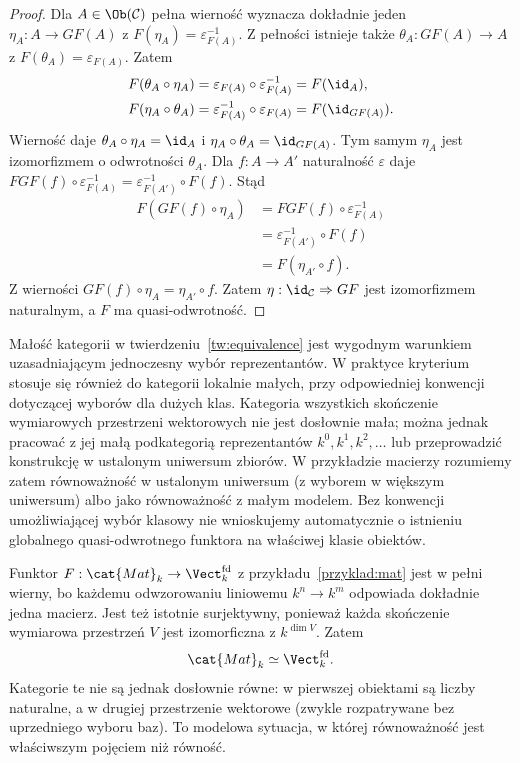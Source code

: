 \begin{proof}
Dla $A\in\Ob(\mathcal C)$ pełna wierność wyznacza dokładnie jeden $\eta_A:A\to GF(A)$ z $F(\eta_A)=\varepsilon_{F(A)}^{-1}$. Z pełności istnieje także $\theta_A:GF(A)\to A$ z $F(\theta_A)=\varepsilon_{F(A)}$. Zatem
\[
\begin{aligned}
F(\theta_A\circ\eta_A)&=\varepsilon_{F(A)}\circ\varepsilon_{F(A)}^{-1}=F(\id_A),\\
F(\eta_A\circ\theta_A)&=\varepsilon_{F(A)}^{-1}\circ\varepsilon_{F(A)}=F(\id_{GF(A)}).
\end{aligned}
\]
Wierność daje $\theta_A\circ\eta_A=\id_A$ i $\eta_A\circ\theta_A=\id_{GF(A)}$. Tym samym $\eta_A$ jest izomorfizmem o odwrotności $\theta_A$. Dla $f:A\to A'$ naturalność $\varepsilon$ daje
$FGF(f)\circ\varepsilon_{F(A)}^{-1}=\varepsilon_{F(A')}^{-1}\circ F(f)$. Stąd
\[
\begin{aligned}
F(GF(f)\circ\eta_A)
&=FGF(f)\circ\varepsilon_{F(A)}^{-1}\\
&=\varepsilon_{F(A')}^{-1}\circ F(f)\\
&=F(\eta_{A'}\circ f).
\end{aligned}
\]
Z wierności $GF(f)\circ\eta_A=\eta_{A'}\circ f$. Zatem $\eta:\id_{\mathcal C}\Rightarrow GF$ jest izomorfizmem naturalnym, a $F$ ma quasi-odwrotność.
\end{proof}


\begin{uwaga}
Małość kategorii w twierdzeniu~\ref{tw:equivalence} jest wygodnym warunkiem uzasadniającym jednoczesny wybór reprezentantów. W praktyce kryterium stosuje się również do kategorii lokalnie małych, przy odpowiedniej konwencji dotyczącej wyborów dla dużych klas. Kategoria wszystkich skończenie wymiarowych przestrzeni wektorowych nie jest dosłownie mała; można jednak pracować z jej małą podkategorią reprezentantów $k^0,k^1,k^2,\ldots$ lub przeprowadzić konstrukcję w ustalonym uniwersum zbiorów. W przykładzie macierzy rozumiemy zatem równoważność w ustalonym uniwersum (z wyborem w większym uniwersum) albo jako równoważność z małym modelem. Bez konwencji umożliwiającej wybór klasowy nie wnioskujemy automatycznie o istnieniu globalnego quasi-odwrotnego funktora na właściwej klasie obiektów.
\end{uwaga}


\begin{przyklad}\label{przyklad:mat-equivalence}
Funktor $F:\cat{Mat}_k\to\Vect_k^{\mathrm{fd}}$ z przykładu~\ref{przyklad:mat} jest w pełni wierny, bo każdemu odwzorowaniu liniowemu $k^n\to k^m$ odpowiada dokładnie jedna macierz. Jest też istotnie surjektywny, ponieważ każda skończenie wymiarowa przestrzeń $V$ jest izomorficzna z $k^{\dim V}$. Zatem
\[
\cat{Mat}_k\simeq\Vect_k^{\mathrm{fd}}.
\]
Kategorie te nie są jednak dosłownie równe: w pierwszej obiektami są liczby naturalne, a w drugiej przestrzenie wektorowe (zwykle rozpatrywane bez uprzedniego wyboru baz). To modelowa sytuacja, w której równoważność jest właściwszym pojęciem niż równość.
\end{przyklad}

